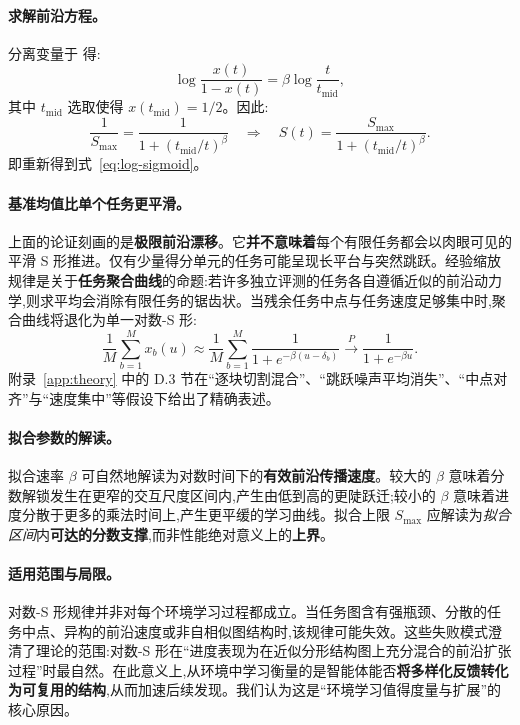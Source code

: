 \paragraph{求解前沿方程。} 分离变量于  得:
\[
    \log \frac{x(t)}{1 - x(t)} = \beta \log \frac{t}{t_{\mathrm{mid}}},
\]
其中 $t_{\mathrm{mid}}$ 选取使得 $x(t_{\mathrm{mid}}) = 1/2$。因此:
\begin{equation}
    \frac{1}{S_{\max}} = \frac{1}{1 + (t_{\mathrm{mid}}/t)^{\beta}} \quad\Longrightarrow\quad S(t) = \frac{S_{\max}}{1 + (t_{\mathrm{mid}}/t)^{\beta}}.
    \label{eq:solve}
\end{equation}
即重新得到式~\ref{eq:log-sigmoid}。

\paragraph{基准均值比单个任务更平滑。} 上面的论证刻画的是\textbf{极限前沿漂移}。它\textbf{并不意味着}每个有限任务都会以肉眼可见的平滑 S 形推进。仅有少量得分单元的任务可能呈现长平台与突然跳跃。经验缩放规律是关于\textbf{任务聚合曲线}的命题:若许多独立评测的任务各自遵循近似的前沿动力学,则求平均会消除有限任务的锯齿状。当残余任务中点与任务速度足够集中时,聚合曲线将退化为单一对数-S 形:
\[
    \frac{1}{M}\sum_{b=1}^{M} x_{b}(u) \approx \frac{1}{M}\sum_{b=1}^{M} \frac{1}{1 + e^{-\beta(u - \delta_{b})}} \xrightarrow{P} \frac{1}{1 + e^{-\beta u}}.
\]
附录~\ref{app:theory} 中的 D.3 节在``逐块切割混合''、``跳跃噪声平均消失''、``中点对齐''与``速度集中''等假设下给出了精确表述。

\paragraph{拟合参数的解读。} 拟合速率 $\beta$ 可自然地解读为对数时间下的\textbf{有效前沿传播速度}。较大的 $\beta$ 意味着分数解锁发生在更窄的交互尺度区间内,产生由低到高的更陡跃迁;较小的 $\beta$ 意味着进度分散于更多的乘法时间上,产生更平缓的学习曲线。拟合上限 $S_{\max}$ 应解读为\textit{拟合区间}内\textbf{可达的分数支撑},而非性能绝对意义上的\textbf{上界}。

\paragraph{适用范围与局限。} 对数-S 形规律并非对每个环境学习过程都成立。当任务图含有强瓶颈、分散的任务中点、异构的前沿速度或非自相似图结构时,该规律可能失效。这些失败模式澄清了理论的范围:对数-S 形在``进度表现为在近似分形结构图上充分混合的前沿扩张过程''时最自然。在此意义上,从环境中学习衡量的是智能体能否\textbf{将多样化反馈转化为可复用的结构},从而加速后续发现。我们认为这是``环境学习值得度量与扩展''的核心原因。

